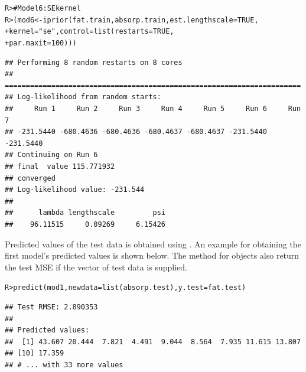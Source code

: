 \documentclass[showframe,11pt,twoside,openright]{report}\usepackage[]{graphicx}\usepackage[]{color}
\makeatletter
\newcommand{\hlnum}[1]{\textcolor[rgb]{0.063,0.58,0.627}{#1}}%
\newcommand{\hlstr}[1]{\textcolor[rgb]{0.063,0.58,0.627}{#1}}%
\newcommand{\hlcom}[1]{\textcolor[rgb]{0.588,0.588,0.588}{#1}}%
\newcommand{\hlstd}[1]{\textcolor[rgb]{0.196,0.196,0.196}{#1}}%
\newcommand{\hlkwb}[1]{\textcolor[rgb]{0.627,0,0.314}{#1}}%
\newcommand{\hlkwc}[1]{\textcolor[rgb]{0,0.631,0.314}{#1}}%
\newcommand{\hlkwd}[1]{\textcolor[rgb]{0.78,0.227,0.412}{#1}}%
\newenvironment{kframe}{%
 \def\at@end@of@kframe{}%
 \ifinner\ifhmode%
  \def\at@end@of@kframe{\end{minipage}}%
  \begin{minipage}{\columnwidth}%
 \fi\fi%
 \def\FrameCommand##1{\hskip\@totalleftmargin \hskip-\fboxsep
 \colorbox{shadecolor}{##1}\hskip-\fboxsep
     \hskip-\linewidth \hskip-\@totalleftmargin \hskip\columnwidth}%
 \MakeFramed {\advance\hsize-\width
   \@totalleftmargin\z@ \linewidth\hsize
   \@setminipage}}%
 {\par\unskip\endMakeFramed%
 \at@end@of@kframe}
\newenvironment{knitrout}{}{} %
\makeatother
\begin{document}
\begin{knitrout}
\color{fgcolor}\begin{kframe}
\begin{alltt}
\hlstd{R> }\hlcom{# Model 6: SE kernel}
\hlstd{R> }\hlstd{(mod6} \hlkwb{<-} \hlkwd{iprior}\hlstd{(fat.train, absorp.train,} \hlkwc{est.lengthscale} \hlstd{=} \hlnum{TRUE}\hlstd{,}
\hlstd{+  }                \hlkwc{kernel} \hlstd{=} \hlstr{"se"}\hlstd{,} \hlkwc{control} \hlstd{=} \hlkwd{list}\hlstd{(}\hlkwc{restarts} \hlstd{=} \hlnum{TRUE}\hlstd{,}
\hlstd{+  }                                              \hlkwc{par.maxit} \hlstd{=} \hlnum{100}\hlstd{)))}
\end{alltt}
\begin{verbatim}
## Performing 8 random restarts on 8 cores
## ======================================================================
## Log-likelihood from random starts:
##     Run 1     Run 2     Run 3     Run 4     Run 5     Run 6     Run 7 
## -231.5440 -680.4636 -680.4636 -680.4637 -680.4637 -231.5440 -231.5440 
## Continuing on Run 6 
## final  value 115.771932 
## converged
## Log-likelihood value: -231.544 
## 
##      lambda lengthscale         psi 
##    96.11515     0.09269     6.15426
\end{verbatim}
\end{kframe}
\end{knitrout}



Predicted values of the test data is obtained using .
An example for obtaining the first model's predicted values is shown below.
The  method for  objects also return the test MSE if the vector of test data is supplied.

\begin{knitrout}
\color{fgcolor}\begin{kframe}
\begin{alltt}
\hlstd{R> }\hlkwd{predict}\hlstd{(mod1,} \hlkwc{newdata} \hlstd{=} \hlkwd{list}\hlstd{(absorp.test),} \hlkwc{y.test} \hlstd{= fat.test)}
\end{alltt}
\begin{verbatim}
## Test RMSE: 2.890353 
## 
## Predicted values:
##  [1] 43.607 20.444  7.821  4.491  9.044  8.564  7.935 11.615 13.807
## [10] 17.359
## # ... with 33 more values
\end{verbatim}
\end{kframe}
\end{knitrout}
\end{document}
